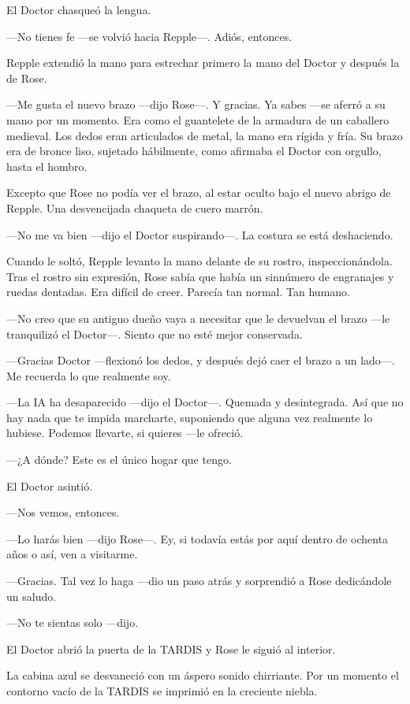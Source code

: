 {El Doctor chasqueó la lengua.}

{---No tienes fe ---se volvió hacia Repple---. Adiós, entonces.}

{Repple extendió la mano para estrechar primero la mano del Doctor y
después la de Rose.}

{---Me gusta el nuevo brazo ---dijo Rose---. Y gracias. Ya sabes ---se
	aferró a su mano por un momento. Era como el guantelete de la armadura
	de un caballero medieval. Los dedos eran articulados de metal, la mano
	era rígida y fría. Su brazo era de bronce liso, sujetado hábilmente,
como afirmaba el Doctor con orgullo, hasta el hombro.}

{Excepto que Rose no podía ver el brazo, al estar oculto bajo el nuevo
abrigo de Repple. Una desvencijada chaqueta de cuero marrón.}

{---No me va bien ---dijo el Doctor suspirando---. La costura se está
deshaciendo.}

{Cuando le soltó, Repple levanto la mano delante de su rostro,
	inspeccionándola. Tras el rostro sin expresión, Rose sabía que había un
	sinnúmero de engranajes y ruedas dentadas. Era difícil de creer. Parecía
tan normal. Tan humano.}

{---No creo que su antiguo dueño vaya a necesitar que le devuelvan el
	brazo ---le tranquilizó el Doctor---. Siento que no esté mejor
conservada.}

{---Gracias Doctor ---flexionó los dedos, y después dejó caer el brazo a
un lado---. Me recuerda lo que realmente soy.}

{---La IA ha desaparecido ---dijo el Doctor---. Quemada y desintegrada.
	Así que no hay nada que te impida marcharte, suponiendo que alguna vez
realmente lo hubiese. Podemos llevarte, si quieres ---le ofreció.}

{---¿A dónde? Este es el único hogar que tengo.}

{El Doctor asintió.}

{---Nos vemos, entonces.}

{---Lo harás bien ---dijo Rose---. Ey, si todavía estás por aquí dentro
de ochenta años o así, ven a visitarme.}

{---Gracias. Tal vez lo haga ---dio un paso atrás y sorprendió a Rose
dedicándole un saludo.}

{---No te sientas solo ---dijo.}

{El Doctor abrió la puerta de la TARDIS y Rose le siguió al interior.}

{La cabina azul se desvaneció con un áspero sonido chirriante. Por un
	momento el contorno vacío de la TARDIS se imprimió en la creciente
niebla.}

